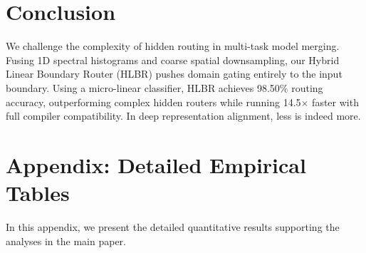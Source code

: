 \documentclass{article}
\theoremstyle{plain}
\theoremstyle{definition}
\theoremstyle{remark}
\begin{document}
\section{Conclusion}
\label{sec:conclusion}
We challenge the complexity of hidden routing in multi-task model merging. Fusing 1D spectral histograms and coarse spatial downsampling, our Hybrid Linear Boundary Router (HLBR) pushes domain gating entirely to the input boundary. Using a micro-linear classifier, HLBR achieves 98.50\% routing accuracy, outperforming complex hidden routers while running 14.5$\times$ faster with full compiler compatibility. In deep representation alignment, less is indeed more.




\clearpage
\appendix
\section{Appendix: Detailed Empirical Tables}
\label{sec:appendix}

In this appendix, we present the detailed quantitative results supporting the analyses in the main paper.

\begin{table}[h]
\caption{Impact of HLBR feature configuration on WA performance ($N=128$) (discussed in Subsection 4.4).}
\label{tab:ablation_configs}
\begin{center}
\begin{small}
\end{small}
\end{center}
\end{table}
\end{document}

